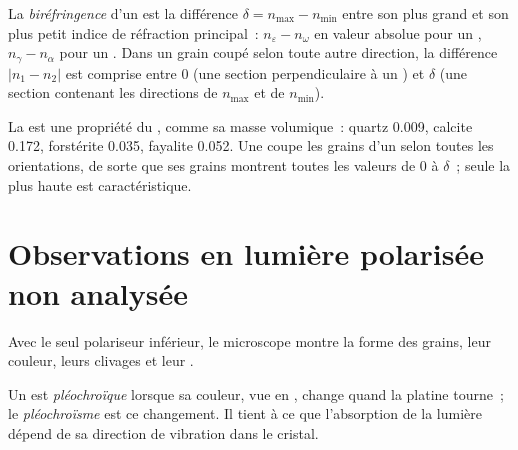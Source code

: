 \begin{definition}\label{def:b1:optical-mineralogy:birefringence}
La \emph{biréfringence} d'un  est la différence
$\delta = n_{\max} - n_{\min}$ entre son plus grand et son plus petit indice de
réfraction principal~: $n_\varepsilon - n_\omega$ en valeur absolue pour un
 , $n_\gamma - n_\alpha$ pour un  . Dans un grain coupé
selon toute autre direction, la différence $|n_1 - n_2|$ est comprise entre 0
(une section perpendiculaire à un ) et $\delta$ (une section contenant
les directions de $n_{\max}$ et de $n_{\min}$).
\end{definition}

La  est une propriété du , comme sa masse volumique~: quartz
\num{0.009}, calcite \num{0.172}, forstérite \num{0.035}, fayalite
\num{0.052}. Une  coupe les grains d'un  selon toutes les
orientations, de sorte que ses grains montrent toutes les valeurs de 0 à
$\delta$~; seule la plus haute est caractéristique.

\section{Observations en lumière polarisée non analysée}

Avec le seul polariseur inférieur, le microscope montre la forme des grains, leur
couleur, leurs clivages et leur .

\begin{definition}[Pléochroïsme]\label{def:b1:optical-mineralogy:pleochroism}
Un  est \emph{pléochroïque} lorsque sa couleur, vue en , change quand la platine tourne~; le
\emph{pléochroïsme} est ce changement. Il tient à ce que l'absorption de la
lumière dépend de sa direction de vibration dans le cristal.
\end{definition}

